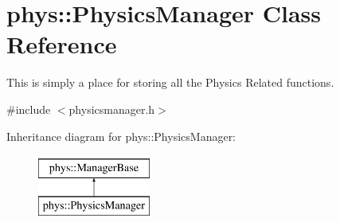 \hypertarget{classphys_1_1PhysicsManager}{
\section{phys::PhysicsManager Class Reference}
\label{d3/dcc/classphys_1_1PhysicsManager}
}


This is simply a place for storing all the Physics Related functions.  




{\ttfamily \#include $<$physicsmanager.h$>$}

Inheritance diagram for phys::PhysicsManager:\begin{figure}[H]
\begin{center}
\leavevmode
\includegraphics[height=2.000000cm]{d3/dcc/classphys_1_1PhysicsManager}
\end{center}
\end{figure}
